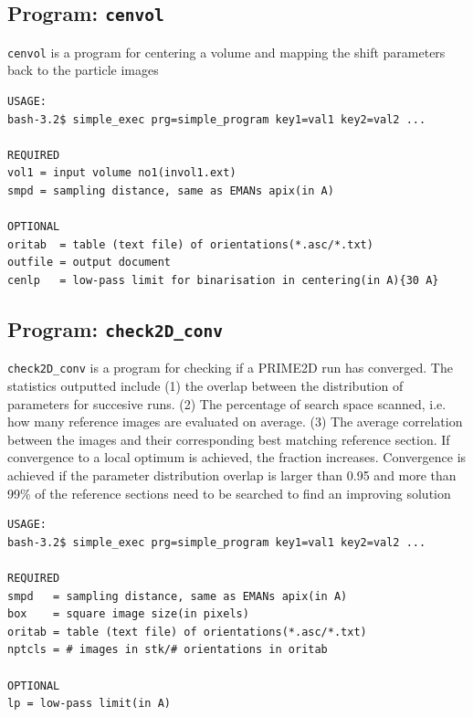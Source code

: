 \documentclass[a4paper,11pt]{article}
\newcommand{\prgname}[1]{\textcolor{NavyBlue}{\texttt{#1}}}
\begin{document}
\subsection{Program: \prgname{cenvol}}
\label{cenvol}
\prgname{cenvol} is a program for centering a volume and mapping the shift parameters back to the particle images

\begin{verbatim}
USAGE:
bash-3.2$ simple_exec prg=simple_program key1=val1 key2=val2 ...

REQUIRED
vol1 = input volume no1(invol1.ext)
smpd = sampling distance, same as EMANs apix(in A)

OPTIONAL
oritab  = table (text file) of orientations(*.asc/*.txt)
outfile = output document
cenlp   = low-pass limit for binarisation in centering(in A){30 A}
\end{verbatim}

\subsection{Program: \prgname{check2D\_conv}}
\label{check2D_conv}
\prgname{check2D\_conv} is a program for checking if a PRIME2D run has converged. The statistics outputted include (1) the overlap between the distribution of parameters for succesive runs. (2) The percentage of search space scanned, i.e. how many reference images are evaluated on average. (3) The average correlation between the images and their corresponding best matching reference section. If convergence to a local optimum is achieved, the fraction increases. Convergence is achieved if the parameter distribution overlap is larger than 0.95 and more than 99\% of the reference sections need to be searched to find an improving solution

\begin{verbatim}
USAGE:
bash-3.2$ simple_exec prg=simple_program key1=val1 key2=val2 ...

REQUIRED
smpd   = sampling distance, same as EMANs apix(in A)
box    = square image size(in pixels)
oritab = table (text file) of orientations(*.asc/*.txt)
nptcls = # images in stk/# orientations in oritab

OPTIONAL
lp = low-pass limit(in A)
\end{verbatim}
\end{document}
